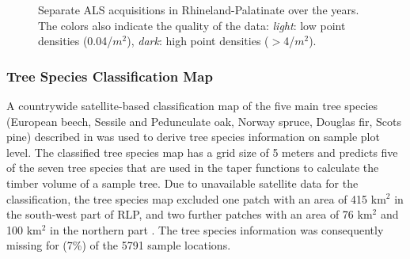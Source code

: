 \begin{figure}[H]
\centering
{}
\caption{Separate ALS acquisitions in Rhineland-Palatinate over the years. The colors also indicate the quality of the data: \textit{light}: low point densities (0.04/$m^2$), \textit{dark}: high point densities ($>$4/$m^2$). }
\label{abb:lidaryears}
\end{figure}



\subsubsection{Tree Species Classification Map}
\label{sec:tspecclass}

A countrywide satellite-based classification map of the five main tree species (European beech, Sessile and Pedunculate oak, Norway spruce, Douglas fir, Scots pine) described in \citet{stoffels2015} was used to derive tree species information on sample plot level. The classified tree species map has a grid size of 5 meters and predicts five of the seven tree species that are used in the \bwi{} taper functions \citep{kublin2013} to calculate the timber volume of a sample tree. Due to unavailable satellite data for the classification, the tree species map excluded one patch with an area of 415 km$^2$ in the south-west part of RLP, and two further patches with an area of 76 km$^2$ and 100 km$^2$ in the northern part \citep{stoffels2015}. The tree species information was consequently missing for  (7\%) of the 5791 sample locations.

